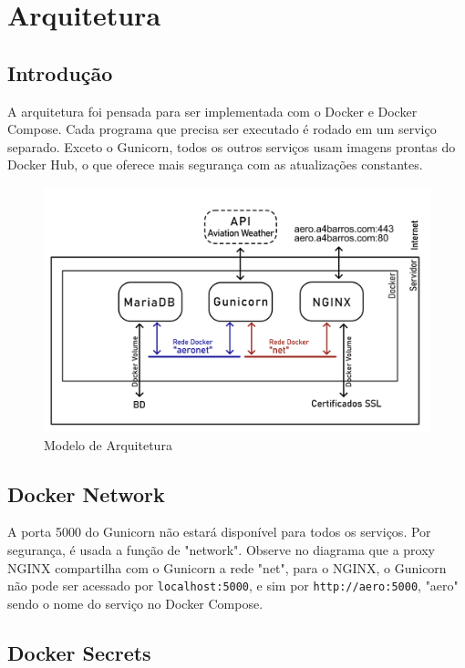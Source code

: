 \chapter{Arquitetura}

\section{Introdução}
A arquitetura foi pensada para ser implementada com o Docker e Docker Compose. Cada
programa que precisa ser executado é rodado em um serviço separado. Exceto o Gunicorn,
todos os outros serviços usam imagens prontas do Docker Hub, o que oferece mais segurança
com as atualizações constantes.

\begin{figure}[ht]
    \begin{center}
    \includegraphics[width=\linewidth]{img/diagrama-arquitetura.png}
    \caption{Modelo de Arquitetura}
    \label{fig:arquitetura}
    \end{center}
\end{figure}

\section{Docker Network}
A porta 5000 do Gunicorn não estará disponível para todos os serviços. Por segurança, é usada a função de
"network". Observe no diagrama que a proxy NGINX compartilha com o Gunicorn a rede "net", para o NGINX,
o Gunicorn não pode ser acessado por \texttt{localhost:5000}, e sim por \texttt{http://aero:5000}, "aero"
sendo o nome do serviço no Docker Compose.


\section{Docker Secrets}

